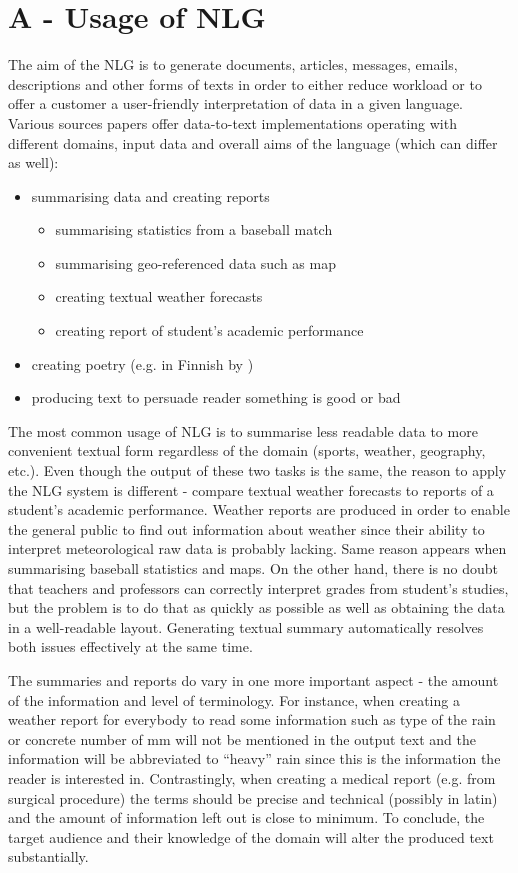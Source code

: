 \section{A - Usage of NLG}
The aim of the NLG is to generate documents, articles, messages, emails, descriptions and other forms of texts in order to either reduce workload or to offer a customer a user-friendly interpretation of data in a given language. Various sources papers offer data-to-text implementations operating with different domains, input data and overall aims of the language (which can differ as well):
\begin{itemize}
	\item summarising data and creating reports 
	\begin{itemize}
		\item summarising statistics from a baseball match \cite{puduppully2022data}
		\item summarising geo-referenced data such as map \cite{thomas2007atlas}
		\item creating textual weather forecasts \cite{sripada2014case}
		\item creating report of student's academic performance \cite{}
	\end{itemize}
	\item creating poetry (e.g. in Finnish by \cite{hamalainen2018harnessing})
	\item producing text to persuade reader something is good or bad \cite{carenini2006generating}
\end{itemize}
The most common usage of NLG is to summarise less readable data to more convenient textual form regardless of the domain (sports, weather, geography, etc.). Even though the output of these two tasks is the same, the reason to apply the NLG system is different - compare textual weather forecasts to reports of a student's academic performance. Weather reports are produced in order to enable the general public to find out information about weather since their ability to interpret meteorological raw data is probably lacking. Same reason appears when summarising baseball statistics and maps. On the other hand, there is no doubt that teachers and professors can correctly interpret grades from student’s studies, but the problem is to do that as quickly as possible as well as obtaining the data in a well-readable layout. Generating textual summary automatically resolves both issues effectively at the same time.

The summaries and reports do vary in one more important aspect - the amount of the information and level of terminology. For instance, when creating a weather report for everybody to read some information such as type of the rain or concrete number of mm will not be mentioned in the output text and the information will be abbreviated to “heavy” rain since this is the information the reader is interested in. Contrastingly, when creating a medical report (e.g. from surgical procedure) the terms should be precise and technical (possibly in latin) and the amount of information left out is close to minimum. To conclude, the target audience and their knowledge of the domain will alter the produced text substantially.

